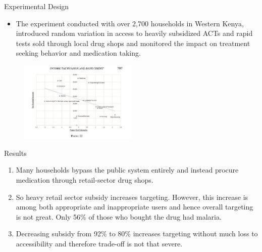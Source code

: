\documentclass{beamer}
\begin{document}
\begin{frame}{Experimental Design}
\begin{itemize}

    \item The experiment  conducted with over 2,700 households in Western Kenya, introduced random variation in
    access to heavily subsidized ACTs and rapid tests sold through local drug shops and monitored the impact on treatment seeking behavior and medication taking.
    


\end{itemize}
\begin{figure}

\includegraphics[width=0.5\textwidth]{F2.png}
\end{figure}

    \end{frame}



\begin{frame}[allowframebreaks]{Results}  
\begin{enumerate}
\item Many households bypass the public system
entirely and instead procure medication through retail-sector drug shops.
\item So heavy retail sector subsidy increases targeting. However, this increase is among both appropriate and inappropriate users and hence overall targeting is not great. Only 56\% of those who bought the drug had malaria.
\item Decreasing subsidy from 92\% to 80\% increases targeting without much loss to accessibility and therefore trade-off is not that severe.

    \end{enumerate}
\end{frame}
\end{document}
